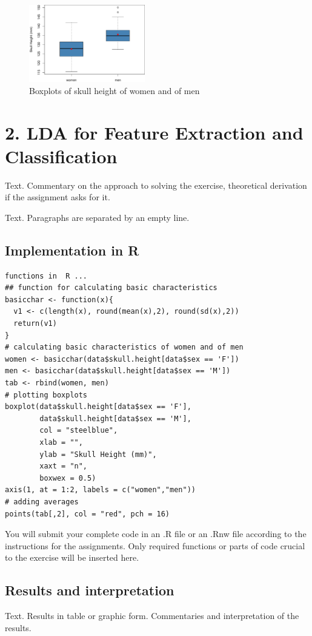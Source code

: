 \begin{figure}[ht]
\centering
\includegraphics[angle=0,width=0.45\textwidth]{boxplot-example.pdf}
\caption{Boxplots of skull height of women and of men}
\end{figure}

\newpage

\section*{2. LDA for Feature Extraction and Classification}
\noindent Text. Commentary on the approach to solving the exercise, theoretical derivation if the assignment asks for it.

Text. Paragraphs are separated by an empty line. 

\subsection*{Implementation in R}
\begin{lstlisting}
functions in  R ...
## function for calculating basic characteristics
basicchar <- function(x){
  v1 <- c(length(x), round(mean(x),2), round(sd(x),2))
  return(v1)
}
# calculating basic characteristics of women and of men
women <- basicchar(data$skull.height[data$sex == 'F'])
men <- basicchar(data$skull.height[data$sex == 'M'])
tab <- rbind(women, men)
# plotting boxplots
boxplot(data$skull.height[data$sex == 'F'], 
        data$skull.height[data$sex == 'M'],
        col = "steelblue", 
        xlab = "",
        ylab = "Skull Height (mm)",
        xaxt = "n", 
        boxwex = 0.5)
axis(1, at = 1:2, labels = c("women","men"))
# adding averages
points(tab[,2], col = "red", pch = 16)
\end{lstlisting}

You will submit your complete code in an \textsf{.R} file or an \textsf{.Rnw} file according to the instructions for the assignments. Only required functions or parts of code crucial to the exercise will be inserted here.
\bigskip
\subsection*{Results and interpretation}
\noindent Text. Results in table or graphic form. Commentaries and interpretation of the results.

